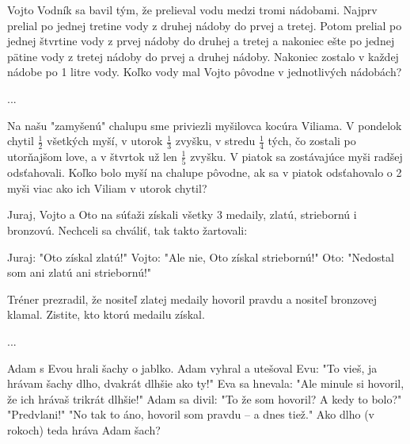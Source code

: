 {%
Vojto Vodník sa bavil tým, že prelieval vodu medzi tromi nádobami. Najprv prelial po
jednej tretine vody z druhej nádoby do prvej a tretej. Potom prelial po jednej štvrtine
vody z prvej nádoby do druhej a tretej a nakoniec ešte po jednej pätine vody z tretej
nádoby do prvej a druhej nádoby. Nakoniec zostalo v každej nádobe po 1 litre vody.
Koľko vody mal Vojto pôvodne v jednotlivých nádobách?}

{%
...}

{%
Na našu "zamyšenú" chalupu sme priviezli myšilovca kocúra Viliama. V pondelok
chytil $\frac12$ všetkých myší, v utorok $\frac13$ zvyšku, v stredu $\frac14$ tých, čo zostali po utorňajšom
love, a v štvrtok už len $\frac15$ zvyšku. V piatok sa zostávajúce myši radšej odsťahovali.
Koľko bolo myší na chalupe pôvodne, ak sa v piatok odsťahovalo o 2 myši viac ako
ich Viliam v utorok chytil?}

{%
Juraj, Vojto a Oto na súťaži získali všetky 3 medaily, zlatú, striebornú i bronzovú.
Nechceli sa chváliť, tak takto žartovali:
\begin{itemize}
\itemvar{} Juraj: "Oto získal zlatú!"
\itemvar{} Vojto: "Ale nie, Oto získal striebornú!"
\itemvar{} Oto: "Nedostal som ani zlatú ani striebornú!"
\end{itemize}
\noindent
Tréner prezradil, že nositeľ zlatej medaily hovoril pravdu a nositeľ bronzovej klamal.
Zistite, kto ktorú medailu získal.}

{%
...}

{%
Adam s Evou hrali šachy o jablko.
Adam vyhral a utešoval Evu: "To vieš, ja hrávam šachy dlho, dvakrát dlhšie ako ty!"
Eva sa hnevala: "Ale minule si hovoril, že ich hrávaš trikrát dlhšie!"
Adam sa divil: "To že som hovoril? A kedy to bolo?"
"Predvlani!"
"No tak to áno, hovoril som pravdu -- a dnes tiež."
Ako dlho (v rokoch) teda hráva Adam šach?}


